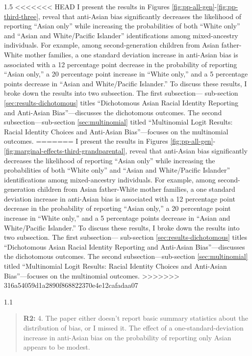 \documentclass[12pt,english]{article}
\newcommand{\rrquote}{1.1}
\newcommand{\rrxspc}{1.5}
\begin{document}
\begin{refsection}
\begin{spacing}{\rrxspc}
<<<<<<< HEAD
            I present the results in Figures \ref{fig:pp-all-gen}-\ref{fig:pp-third-three}, reveal that anti-Asian bias significantly decreases the likelihood of reporting ``Asian only'' while increasing the probabilities of both ``White only'' and ``Asian and White/Pacific Islander'' identifications among mixed-ancestry individuals. For example, among second-generation children from Asian father-White mother families, a one standard deviation increase in anti-Asian bias is associated with a 12 percentage point decrease in the probability of reporting ``Asian only,'' a 20 percentage point increase in ``White only,'' and a 5 percentage points decrease in ``Asian and White/Pacific Islander.'' To discuss these results, I broke down the results into two subsection. The first subsection--- sub-section \ref{sec:results-dichotomous} titles ``Dichotomous Asian Racial Identity Reporting and Anti-Asian Bias''---discusses the dichotomous outcomes. The second subsection---sub-section \ref{sec:multinomial} titled ``Multinomial Logit Results: Racial Identity Choices and Anti-Asian Bias''---focuses on the multinomial outcomes.
=======
            I present the results in Figures \ref{fig:pp-all-gen}-\ref{fig:marginal-effects-third-grandparental}, reveal that anti-Asian bias significantly decreases the likelihood of reporting ``Asian only'' while increasing the probabilities of both ``White only'' and ``Asian and White/Pacific Islander'' identifications among mixed-ancestry individuals. For example, among second-generation children from Asian father-White mother families, a one standard deviation increase in anti-Asian bias is associated with a 12 percentage point decrease in the probability of reporting ``Asian only,'' a 20 percentage point increase in ``White only,'' and a 5 percentage points decrease in ``Asian and White/Pacific Islander.'' To discuss these results, I broke down the results into two subsection. The first subsection--- sub-section \ref{sec:results-dichotomous} titles ``Dichotomous Asian Racial Identity Reporting and Anti-Asian Bias''---discusses the dichotomous outcomes. The second subsection---sub-section \ref{sec:multinomial} titled ``Multinomial Logit Results: Racial Identity Choices and Anti-Asian Bias''---focuses on the multinomial outcomes.
>>>>>>> 316a54059d1a2890f868822370e4e12cafadaa07

    \end{spacing}

    \begin{spacing}{\rrquote}
        \begin{quotation}
        \textbf{R2: } 4. The paper either doesn’t report basic summary statistics about the distribution of bias, or I missed it. The effect of a one-standard-deviation increase in anti-Asian bias on the probability of reporting only Asian appears to be modest.
        \end{quotation}
        \end{spacing}
        

\end{refsection}
\end{document}
